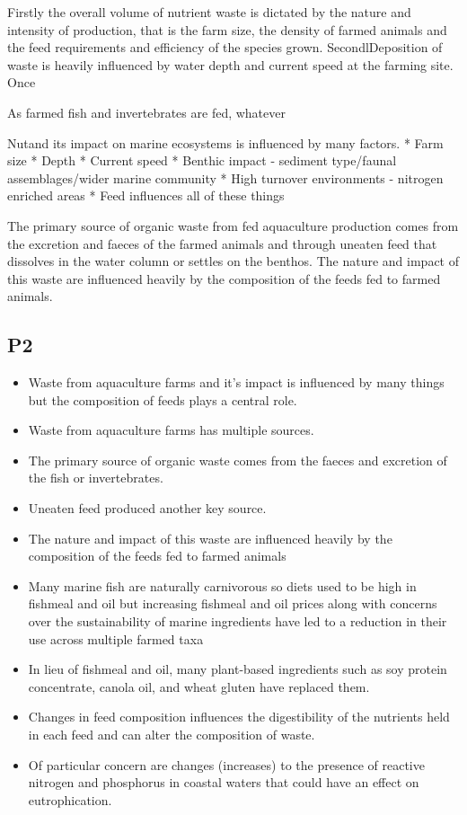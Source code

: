 \documentclass[
  a4paper,
]{article}
\providecommand{\tightlist}{%
  \setlength{\itemsep}{0pt}\setlength{\parskip}{0pt}}\usepackage{longtable,booktabs,array}
\begin{document}
Firstly the overall volume of nutrient waste is dictated by the nature
and intensity of production, that is the farm size, the density of
farmed animals and the feed requirements and efficiency of the species
grown. SecondlDeposition of waste is heavily influenced by water depth
and current speed at the farming site. Once

As farmed fish and invertebrates are fed, whatever

Nutand its impact on marine ecosystems is influenced by many factors. *
Farm size * Depth * Current speed * Benthic impact - sediment
type/faunal assemblages/wider marine community * High turnover
environments - nitrogen enriched areas * Feed influences all of these
things

The primary source of organic waste from fed aquaculture production
comes from the excretion and faeces of the farmed animals and through
uneaten feed that dissolves in the water column or settles on the
benthos. The nature and impact of this waste are influenced heavily by
the composition of the feeds fed to farmed animals.

\subsection{P2}\label{p2}

\begin{itemize}
\tightlist
\item
  Waste from aquaculture farms and it's impact is influenced by many
  things but the composition of feeds plays a central role.
\item
  Waste from aquaculture farms has multiple sources.
\item
  The primary source of organic waste comes from the faeces and
  excretion of the fish or invertebrates.
\item
  Uneaten feed produced another key source.
\item
  The nature and impact of this waste are influenced heavily by the
  composition of the feeds fed to farmed animals
\item
  Many marine fish are naturally carnivorous so diets used to be high in
  fishmeal and oil but increasing fishmeal and oil prices along with
  concerns over the sustainability of marine ingredients have led to a
  reduction in their use across multiple farmed taxa
\item
  In lieu of fishmeal and oil, many plant-based ingredients such as soy
  protein concentrate, canola oil, and wheat gluten have replaced them.
\item
  Changes in feed composition influences the digestibility of the
  nutrients held in each feed and can alter the composition of waste.
\item
  Of particular concern are changes (increases) to the presence of
  reactive nitrogen and phosphorus in coastal waters that could have an
  effect on eutrophication.
\end{itemize}
\end{document}
